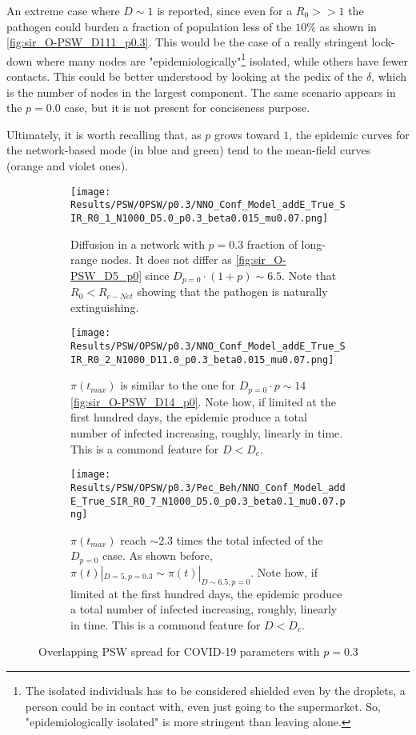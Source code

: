 \documentclass[a4paper,10pt,twoside]{book} %
\theoremstyle{definition}
\begin{document}
An extreme case where $D \sim 1$ is reported, since even for a $R_0 >> 1$ the pathogen could burden a fraction of population less of the $10 \%$ as shown in \autoref{fig:sir_O-PSW_D111_p0.3}. This would be the case of a really stringent lock-down where many nodes are "epidemiologically"\footnote{The isolated individuals has to be considered shielded even by the droplets, a person could be in contact with, even just going to the supermarket. So, "epidemiologically isolated" is more stringent than leaving alone.} isolated, while others have fewer contacts. This could be better understood by looking at the pedix of the $\delta$, which is the number of nodes in the largest component. The same scenario appears in the $p = 0.0$ case, but it is not present for conciseness purpose.

Ultimately, it is worth recalling that, as $p$ grows toward $1$, the epidemic curves for the network-based mode (in blue and green) tend to the mean-field curves (orange and violet ones).

\begin{figure}[p]
	\centering
	\begin{subfigure}[t]{\linewidth}
		\centering
		\texttt{[image: Results/PSW/OPSW/p0.3/NNO\_Conf\_Model\_addE\_True\_SIR\_R0\_1\_N1000\_D5.0\_p0.3\_beta0.015\_mu0.07.png]}
		\caption{Diffusion in a network with $p = 0.3$ fraction of long-range nodes. It does not differ as \autoref{fig:sir_O-PSW_D5_p0} since $D_{p=0} \cdot (1+p) \sim 6.5$. Note that $R_0 < R_{c-Net}$ showing that the pathogen is naturally extinguishing.}
		\label{fig:sir_O-PSW_D5_p0.3}
	\end{subfigure}
	\begin{subfigure}[t]{\linewidth}
		\centering
		\texttt{[image: Results/PSW/OPSW/p0.3/NNO\_Conf\_Model\_addE\_True\_SIR\_R0\_2\_N1000\_D11.0\_p0.3\_beta0.015\_mu0.07.png]}
		\caption{$\pi(t_{max})$ is similar to the one for $D_{p=0} \cdot p \sim 14$ \autoref{fig:sir_O-PSW_D14_p0}. Note how, if limited at the first hundred days, the epidemic produce a total number of infected increasing, roughly, linearly in time. This is a commond feature for $D < D_c$.}
		\label{fig:sir_O-PSW_D11_p0.3}
	\end{subfigure}
	\begin{subfigure}[t]{\linewidth}
		\centering
		\texttt{[image: Results/PSW/OPSW/p0.3/Pec\_Beh/NNO\_Conf\_Model\_addE\_True\_SIR\_R0\_7\_N1000\_D5.0\_p0.3\_beta0.1\_mu0.07.png]}
		\caption{$\pi(t_{max})$ reach $\sim 2.3$ times the total infected of the $D_{p=0}$ case. As shown before, $ \pi(t)|_{D = 5, p = 0.3} \sim \pi(t)|_{D \sim 6.5, p = 0}$. Note how, if limited at the first hundred days, the epidemic produce a total number of infected increasing, roughly, linearly in time. This is a commond feature for $D < D_c$.}
		\label{fig:sir_O-PSW_D5_p0.3_b0.1}
	\end{subfigure}
	\caption{Overlapping PSW spread for COVID-19 parameters with $p = 0.3$ }
\end{figure}
\end{document}
